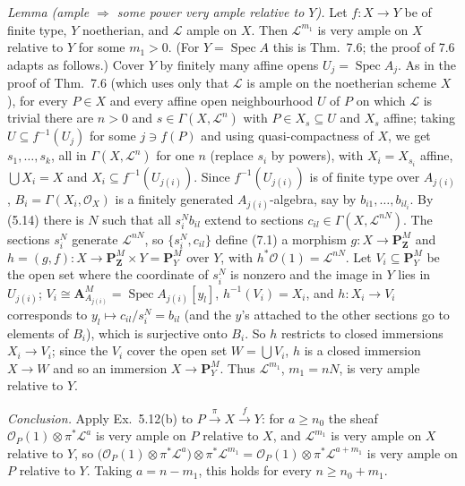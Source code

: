 \documentclass[11pt]{article}
\begin{document}
\emph{Lemma (ample $\Rightarrow$ some power very ample relative to $Y$).} Let $f:X\to Y$ be of finite type, $Y$ noetherian, and $\mathcal L$ ample on $X$. Then $\mathcal L^{m_1}$ is very ample on $X$ relative to $Y$ for some $m_1>0$. (For $Y=\operatorname{Spec}A$ this is Thm.~7.6; the proof of 7.6 adapts as follows.) Cover $Y$ by finitely many affine opens $U_j=\operatorname{Spec}A_j$. As in the proof of Thm.~7.6 (which uses only that $\mathcal L$ is ample on the noetherian scheme $X$), for every $P\in X$ and every affine open neighbourhood $U$ of $P$ on which $\mathcal L$ is trivial there are $n>0$ and $s\in\Gamma(X,\mathcal L^n)$ with $P\in X_s\subseteq U$ and $X_s$ affine; taking $U\subseteq f^{-1}(U_j)$ for some $j\ni f(P)$ and using quasi-compactness of $X$, we get $s_1,\dots,s_k$, all in $\Gamma(X,\mathcal L^n)$ for one $n$ (replace $s_i$ by powers), with $X_i=X_{s_i}$ affine, $\bigcup X_i=X$ and $X_i\subseteq f^{-1}(U_{j(i)})$. Since $f^{-1}(U_{j(i)})$ is of finite type over $A_{j(i)}$, $B_i=\Gamma(X_i,\mathcal O_X)$ is a finitely generated $A_{j(i)}$-algebra, say by $b_{i1},\dots,b_{il_i}$. By (5.14) there is $N$ such that all $s_i^Nb_{il}$ extend to sections $c_{il}\in\Gamma(X,\mathcal L^{nN})$. The sections $s_i^N$ generate $\mathcal L^{nN}$, so $\{s_i^N,c_{il}\}$ define (7.1) a morphism $g:X\to\mathbf P^M_{\mathbf Z}$ and $h=(g,f):X\to\mathbf P^M_{\mathbf Z}\times Y=\mathbf P^M_Y$ over $Y$, with $h^*\mathcal O(1)=\mathcal L^{nN}$. Let $V_i\subseteq\mathbf P^M_Y$ be the open set where the coordinate of $s_i^N$ is nonzero and the image in $Y$ lies in $U_{j(i)}$; $V_i\cong\mathbf A^M_{A_{j(i)}}=\operatorname{Spec}A_{j(i)}[y_{l}]$, $h^{-1}(V_i)=X_i$, and $h:X_i\to V_i$ corresponds to $y_l\mapsto c_{il}/s_i^N=b_{il}$ (and the $y$'s attached to the other sections go to elements of $B_i$), which is surjective onto $B_i$. So $h$ restricts to closed immersions $X_i\to V_i$; since the $V_i$ cover the open set $W=\bigcup V_i$, $h$ is a closed immersion $X\to W$ and so an immersion $X\to\mathbf P^M_Y$. Thus $\mathcal L^{m_1}$, $m_1=nN$, is very ample relative to $Y$.

\emph{Conclusion.} Apply Ex.~5.12(b) to $P\xrightarrow{\pi}X\xrightarrow{f}Y$: for $a\ge n_0$ the sheaf $\mathcal O_P(1)\otimes\pi^*\mathcal L^{a}$ is very ample on $P$ relative to $X$, and $\mathcal L^{m_1}$ is very ample on $X$ relative to $Y$, so $\bigl(\mathcal O_P(1)\otimes\pi^*\mathcal L^{a}\bigr)\otimes\pi^*\mathcal L^{m_1}=\mathcal O_P(1)\otimes\pi^*\mathcal L^{a+m_1}$ is very ample on $P$ relative to $Y$. Taking $a=n-m_1$, this holds for every $n\ge n_0+m_1$.
\end{document}
